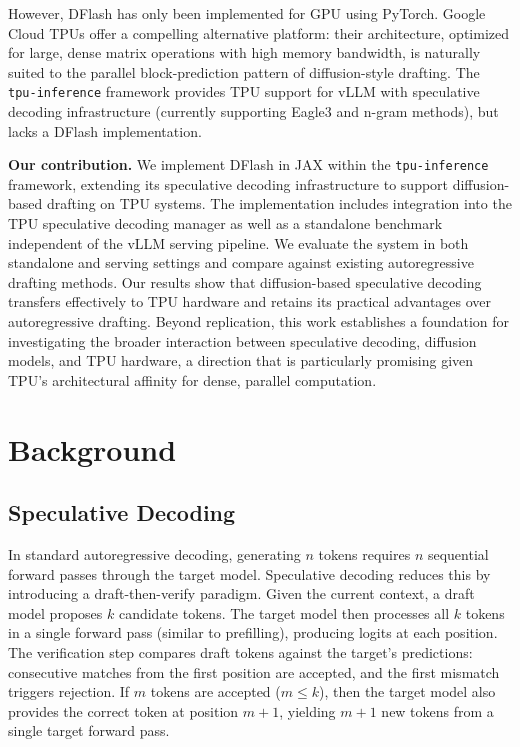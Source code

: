 \documentclass[12pt,letterpaper]{article}
\begin{document}
However, DFlash has only been implemented for GPU using PyTorch. Google Cloud TPUs offer a compelling alternative platform: their architecture, optimized for large, dense matrix operations with high memory bandwidth, is naturally suited to the parallel block-prediction pattern of diffusion-style drafting. The \texttt{tpu-inference} framework \citep{tpuinference} provides TPU support for vLLM with speculative decoding infrastructure (currently supporting Eagle3 and n-gram methods), but lacks a DFlash implementation.

\textbf{Our contribution.} We implement DFlash in JAX within the \texttt{tpu-inference} framework, extending its speculative decoding infrastructure to support diffusion-based drafting on TPU systems. The implementation includes integration into the TPU speculative decoding manager as well as a standalone benchmark independent of the vLLM serving pipeline. We evaluate the system in both standalone and serving settings and compare against existing autoregressive drafting methods. Our results show that diffusion-based speculative decoding transfers effectively to TPU hardware and retains its practical advantages over autoregressive drafting. Beyond replication, this work establishes a foundation for investigating the broader interaction between speculative decoding, diffusion models, and TPU hardware, a direction that is particularly promising given TPU’s architectural affinity for dense, parallel computation.

\section{Background}

\subsection{Speculative Decoding}

In standard autoregressive decoding, generating $n$ tokens requires $n$ sequential forward passes through the target model. Speculative decoding \citep{leviathan2023fastinferencetransformersspeculative} reduces this by introducing a draft-then-verify paradigm. Given the current context, a draft model proposes $k$ candidate tokens. The target model then processes all $k$ tokens in a single forward pass (similar to prefilling), producing logits at each position. The verification step compares draft tokens against the target's predictions: consecutive matches from the first position are accepted, and the first mismatch triggers rejection. If $m$ tokens are accepted ($m \leq k$), then the target model also provides the correct token at position $m+1$, yielding $m+1$ new tokens from a single target forward pass.
\end{document}
